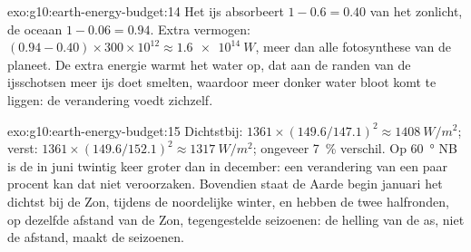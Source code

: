 \begin{solution}{exo:g10:earth-energy-budget:14}
Het ijs absorbeert $1 - 0.6 = 0.40$ van het zonlicht, de oceaan $1 - 0.06 =
0.94$. Extra vermogen: $(0.94 - 0.40) \times 300 \times 10^{12} \approx
\qty{1.6e14}{W}$, meer dan alle fotosynthese van de planeet. De extra energie
warmt het water op, dat aan de randen van de ijsschotsen meer ijs doet smelten,
waardoor meer donker water bloot komt te liggen: de verandering voedt zichzelf.
\end{solution}

\begin{solution}{exo:g10:earth-energy-budget:15}
Dichtstbij: $1361 \times (149.6/147.1)^2 \approx \qty{1408}{W/m^2}$; verst:
$1361 \times (149.6/152.1)^2 \approx \qty{1317}{W/m^2}$; ongeveer
\qty{7}{\percent} verschil. Op \qty{60}{\degree} NB is de  in juni
twintig keer groter dan in december: een verandering van een paar procent kan
dat niet veroorzaken. Bovendien staat de Aarde begin januari het dichtst bij
de Zon, tijdens de noordelijke winter, en hebben de twee halfronden, op dezelfde
afstand van de Zon, tegengestelde seizoenen: de helling van de as, niet de
afstand, maakt de seizoenen.
\end{solution}

